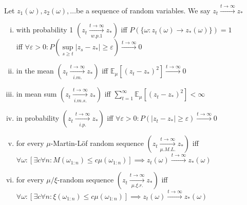 \documentclass[UTF8,11pt,colorlinks,compress,openany]{beamer}%
\begin{document}
\begin{frame}\frametitle{}
\begin{definition}
Let $z_1(\omega),z_2(\omega),\dots$be a sequence of random variables. We say $z_t\xrightarrow{t\to\infty} z_*$
\begin{enumerate}[(i)]
	\item with probability 1 $(z_t\xrightarrow[w.p.1]{t\to\infty} z_*)$ iff $P(\{\omega:z_t(\omega)\to z_*(\omega)\})=1$\\
	iff $\forall\varepsilon>0: P\left(\sup\limits_{s\geq t}|z_s-z_*|\geq\varepsilon\right)\xrightarrow{t\to\infty} 0$
	\item in the mean $(z_t\xrightarrow[i.m.]{t\to\infty} z_*)$ iff $\mathbb{E}_\mu[(z_t-z_*)^2]\xrightarrow{t\to\infty} 0$
	\item in mean sum $(z_t\xrightarrow[i.m.s.]{t\to\infty} z_*)$ iff $\sum\limits_{t=1}^\infty\mathbb{E}_\mu[(z_t-z_*)^2]<\infty$
	\item in probability $(z_t\xrightarrow[i.p.]{t\to\infty} z_*)$ iff $\forall\varepsilon>0: P(|z_t-z_*|\geq\varepsilon)\xrightarrow{t\to\infty} 0$
	\item for every $\mu$-Martin-L{\"o}f random sequence $(z_t\xrightarrow[\mu.M.L.]{t\to\infty} z_*)$ iff\\
	$\forall\omega: [\exists c\forall n: M(\omega_{1:n})\leq c\mu(\omega_{1:n})] \implies z_t(\omega)\xrightarrow{t\to\infty} z_*(\omega)$
	\item for every $\mu/\xi$-random sequence $(z_t\xrightarrow[\mu.\xi.r.]{t\to\infty} z_*)$ iff\\
	$\forall\omega: [\exists c\forall n: \xi(\omega_{1:n})\leq c\mu(\omega_{1:n})] \implies z_t(\omega)\xrightarrow{t\to\infty} z_*(\omega)$
\end{enumerate}
\end{definition}
\end{frame}
\end{document}
